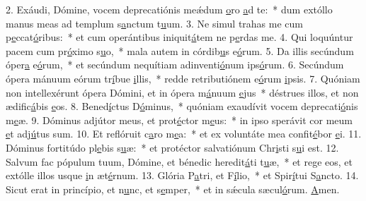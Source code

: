 2. Exáudi, Dómine, vocem deprecatiónis meǽdum \uline{o}ro \uline{a}d te:~* dum extóllo manus meas ad templum s\uline{a}nctum t\uline{u}um.
3. Ne simul trahas me cum p\uline{e}ccat\uline{ó}ribus:~* et cum operántibus iniquit\uline{á}tem ne p\uline{e}rdas me.
4. Qui loquúntur pacem cum pr\uline{ó}ximo s\uline{u}o,~* mala autem in córdib\uline{u}s e\uline{ó}rum.
5. Da illis secúndum óper\uline{a} e\uline{ó}rum,~* et secúndum nequítiam adinventi\uline{ó}num ips\uline{ó}rum.
6. Secúndum ópera mánuum eórum tr\uline{í}bue \uline{i}llis,~* redde retributiónem e\uline{ó}rum \uline{i}psis.
7. Quóniam non intellexérunt ópera Dómini, et in ópera m\uline{á}nuum \uline{e}jus~* déstrues illos, et non ædific\uline{á}bis \uline{e}os.
8. Bened\uline{í}ctus D\uline{ó}minus,~* quóniam exaudívit vocem deprecati\uline{ó}nis m\uline{e}æ.
9. Dóminus adjútor meus, et prot\uline{é}ctor m\uline{e}us:~* in ipso sperávit cor meum \uline{e}t adj\uline{ú}tus sum.
10. Et reflóruit c\uline{a}ro m\uline{e}a:~* et ex voluntáte mea confit\uline{é}bor \uline{e}i.
11. Dóminus fortitúdo pl\uline{e}bis s\uline{u}æ:~* et protéctor salvatiónum Chr\uline{i}sti s\uline{u}i est.
12. Salvum fac pópulum tuum, Dómine, et bénedic heredit\uline{á}ti t\uline{u}æ,~* et rege eos, et extólle illos usque \uline{i}n æt\uline{é}rnum.
13. Glória P\uline{a}tri, et F\uline{í}lio,~* et Spir\uline{í}tui S\uline{a}ncto.
14. Sicut erat in princípio, et n\uline{u}nc, et s\uline{e}mper,~* et in sǽcula sæcul\uline{ó}rum. \uline{A}men.

